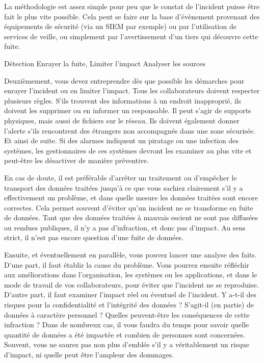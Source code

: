 La méthodologie est assez simple pour peu que le constat de l'incident puisse être fait le plus vite possible. Cela peut se faire sur la base d'évènement provenant des équipements de sécurité (via un SIEM par exemple) ou par l'utilisation de services de veille, ou simplement par l'avertissement d'un tiers qui découvre cette fuite. 

Détection
Enrayer la fuite, Limiter l'impact 
Analyser les sources

Deuxièmement, vous devez entreprendre dès que possible les démarches pour enrayer l’incident ou en limiter l’impact. Tous les collaborateurs doivent respecter plusieurs règles. S’ils trouvent des informations à un endroit inapproprié, ils doivent les supprimer ou en informer un responsable. Il peut s’agir de supports physiques, mais aussi de fichiers sur le réseau. Ils doivent également donner l’alerte s’ils rencontrent des étrangers non accompagnés dans une zone sécurisée. Et ainsi de suite. Si des alarmes indiquent un piratage ou une infection des systèmes, les gestionnaires de ces systèmes devront les examiner au plus vite et peut-être les désactiver de manière préventive.

En cas de doute, il est préférable d’arrêter un traitement ou d’empêcher le transport des données traitées jusqu’à ce que vous sachiez clairement s’il y a effectivement un problème, et dans quelle mesure les données traitées sont encore correctes. Cela permet souvent d’éviter qu’un incident ne se transforme en fuite de données. Tant que des données traitées à mauvais escient ne sont pas diffusées ou rendues publiques, il n’y a pas d’infraction, et donc pas d’impact. Au sens strict, il n’est pas encore question d’une fuite de données.

Ensuite, et éventuellement en parallèle, vous pouvez lancer une analyse des faits. D’une part, il faut établir la cause du problème. Vous pourrez ensuite réfléchir aux améliorations dans l’organisation, les systèmes ou les applications, et dans le mode de travail de vos collaborateurs, pour éviter que l’incident ne se reproduise. D’autre part, il faut examiner l’impact réel ou éventuel de l’incident. Y a-t-il des risques pour la confidentialité et l’intégrité des données ? S’agit-il (en partie) de données à caractère personnel ? Quelles peuvent-être les conséquences de cette infraction ? Dans de nombreux cas, il vous faudra du temps pour savoir quelle quantité de données a été impactée et combien de personnes sont concernées. Souvent, vous ne saurez pas non plus d’emblée s’il y a véritablement un risque d’impact, ni quelle peut être l’ampleur des dommages.


